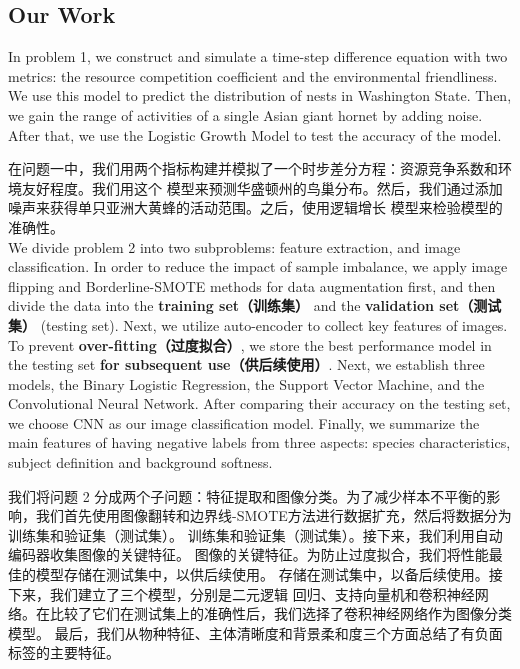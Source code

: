 \documentclass[12pt]{ctexart}
\begin{document}
\subsection{Our Work}
In problem 1, we construct and simulate a time-step difference equation with two metrics:
the resource competition coefficient and the environmental friendliness. We use this
model to predict the distribution of nests in Washington State. Then, we gain the range of
activities of a single Asian giant hornet by adding noise. After that, we use the Logistic Growth
Model to test the accuracy of the model.

在问题一中，我们用两个指标构建并模拟了一个时步差分方程：资源竞争系数和环境友好程度。我们用这个
模型来预测华盛顿州的鸟巢分布。然后，我们通过添加噪声来获得单只亚洲大黄蜂的活动范围。之后，使用逻辑增长
模型来检验模型的准确性。\\

We divide problem 2 into two subproblems: feature extraction, and image classification. In order to 
reduce the impact of sample imbalance, we apply image flipping and Borderline-SMOTE methods for data augmentation first, and then divide the data into the
\textbf{training set（训练集）} and the \textbf{validation set（测试集）} (testing set). Next, we utilize auto-encoder to collect
key features of images. To prevent \textbf{over-fitting（过度拟合）}, we store the best performance model
in the testing set \textbf{for subsequent use（供后续使用）}. Next, we establish three models, the Binary Logistic
Regression, the Support Vector Machine, and the Convolutional Neural Network. After comparing their accuracy on the testing set, we choose CNN as our image classification model.
Finally, we summarize the main features of having negative labels from three aspects: species
characteristics, subject definition and background softness.

我们将问题 2 分成两个子问题：特征提取和图像分类。为了减少样本不平衡的影响，我们首先使用图像翻转和边界线-SMOTE方法进行数据扩充，然后将数据分为训练集和验证集（测试集）。
训练集和验证集（测试集）。接下来，我们利用自动编码器收集图像的关键特征。
图像的关键特征。为防止过度拟合，我们将性能最佳的模型存储在测试集中，以供后续使用。
存储在测试集中，以备后续使用。接下来，我们建立了三个模型，分别是二元逻辑
回归、支持向量机和卷积神经网络。在比较了它们在测试集上的准确性后，我们选择了卷积神经网络作为图像分类模型。
最后，我们从物种特征、主体清晰度和背景柔和度三个方面总结了有负面标签的主要特征。\\
\end{document}
